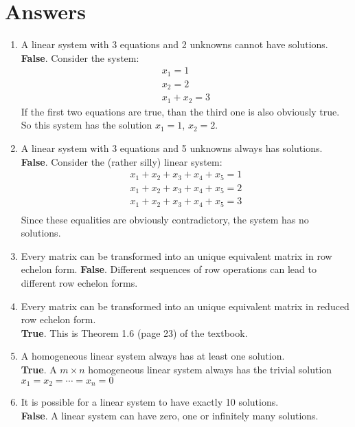 \documentclass[12pt]{article}
\begin{document}
\clearpage

\section{Answers}

\begin{enumerate}

\item A linear system with 3 equations and 2 unknowns cannot have solutions.\\
\textbf{False}. Consider the system:
\[
\begin{matrix}
x_1=1\\
x_2=2\\
x_1+x_2=3
\end{matrix}
\]
If the first two equations are true, than the third one is also obviously true. So this system has the solution $x_1=1$, $x_2=2$.

\item A linear system with 3 equations and 5 unknowns always has solutions.\\
\textbf{False}. Consider the (rather silly) linear system:
\[
\begin{matrix}
x_1+x_2+x_3+x_4+x_5=1\\
x_1+x_2+x_3+x_4+x_5=2\\
x_1+x_2+x_3+x_4+x_5=3\\
\end{matrix}
\]
Since these equalities are obviously contradictory, the system has no solutions.

\item Every matrix can be transformed into an unique equivalent matrix in row echelon form.
\textbf{False}. Different sequences of row operations can lead to different row echelon forms.

\item Every matrix can be transformed into an unique equivalent matrix in reduced row echelon form.\\
\textbf{True}. This is Theorem 1.6 (page 23) of the textbook.

\item A homogeneous linear system always has at least one solution.\\
\textbf{True}. A $m\times n$ homogeneous linear system always has the trivial solution $x_1=x_2=\cdots=x_n=0$

\item It is possible for a linear system to have exactly 10 solutions.\\
\textbf{False}. A linear system can have zero, one or infinitely many solutions.


\end{enumerate}
\end{document}
